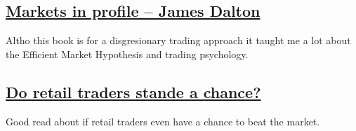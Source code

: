 \documentclass[12pt]{article}
\begin{document}
{\subsection{\href{https://www.r-5.org/files/books/trading/charts/market-profile/James_Dalton-Markets_in_Profile-EN.pdf}{Markets in profile -- James Dalton}}
Altho this book is for a disgresionary trading approach it taught me a lot about the Efficient Market Hypothesis and trading psychology.

\subsection{\href{https://x.com/TradingStable/status/1944181051326165271}{Do retail traders stande a chance?}}

Good read about if retail traders even have a chance to beat the market.
}
\end{document}
